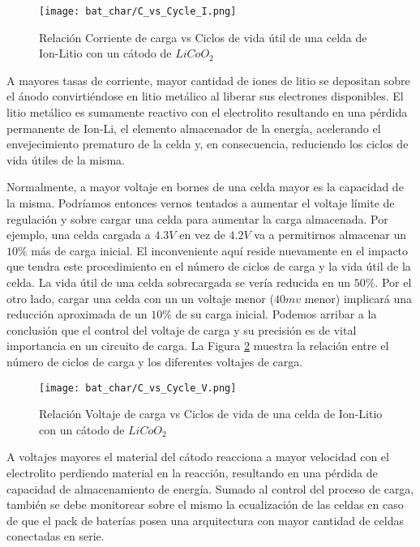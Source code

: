 \begin{figure}[h!] \centering
    \texttt{[image: bat\_char/C\_vs\_Cycle\_I.png]}
    \caption{Relación Corriente de carga vs Ciclos de vida útil de una celda de
    Ion-Litio con un cátodo de $LiCoO_2$} \label{fig:C_vs_Cycle_I} 
\end{figure}
\FloatBarrier

A mayores tasas de corriente, mayor cantidad de iones de litio se depositan
sobre el ánodo convirti\'endose en litio metálico al liberar sus electrones
disponibles.  El litio metálico es sumamente reactivo con el electrolito
resultando en una pérdida permanente de \acrshort{Ion-Li}, el elemento
almacenador de la energía, acelerando el envejecimiento prematuro de la celda y,
 en consecuencia, reduciendo los ciclos de vida útiles de la misma. 

Normalmente, a mayor voltaje en bornes de una celda mayor es la capacidad de la
misma. Podríamos entonces vernos tentados a aumentar el voltaje límite de
regulación y sobre cargar una celda para aumentar la carga almacenada. Por
ejemplo, una celda cargada a $4.3V$ en vez de $4.2V$ va a permitirnos almacenar
un $10\%$ más de carga inicial. El inconveniente aqu\'i reside nuevamente en el
impacto que tendra este procedimiento en el número de ciclos de carga y la vida
útil de la celda. La vida útil de una celda sobrecargada se vería reducida en
un $50\%$.  Por el otro lado, cargar una celda con un un voltaje menor ($40mv$
menor) implicará una reducción aproximada de un $10\%$ de su carga inicial.
Podemos arribar a la conclusión que el control del voltaje de carga y su
precisión es de vital importancia en un circuito de carga. La Figura
\ref{fig:C_vs_Cycle_V} muestra la relación entre el número de ciclos de carga y
los diferentes voltajes de carga. 

\begin{figure}[h!] \centering
    \texttt{[image: bat\_char/C\_vs\_Cycle\_V.png]}
    \caption{Relación Voltaje de carga vs Ciclos de vida de una celda de
             Ion-Litio con un cátodo de $LiCoO_2$} 
         \label{fig:C_vs_Cycle_V} 
     \end{figure}
\FloatBarrier

A voltajes mayores el material del cátodo reacciona a mayor velocidad con el
electrolito perdiendo material en la reacción, resultando en una p\'erdida de
capacidad de almacenamiento de energía. Sumado al control del proceso de carga,
tambi\'en se debe monitorear sobre el mismo la ecualizaci\'on de las celdas en
caso de que el pack de bater\'ias posea una arquitectura con mayor cantidad de
celdas conectadas en serie.

